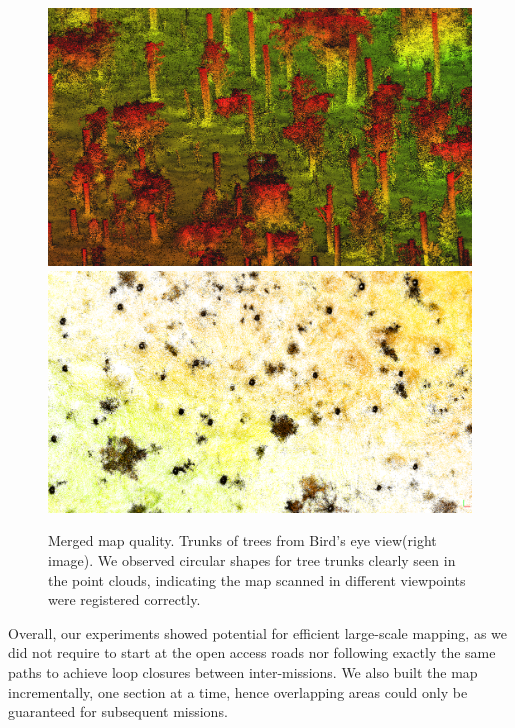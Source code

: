\begin{figure}[htbp]
  \centering
  \includegraphics[width=0.49\columnwidth]{pics/exp_3_offline_pointclouds_trunk.png}
  \includegraphics[width=0.49\columnwidth]{pics/exp_3_offline_pointclouds_trunk_BV3.png}
  \caption{Merged map quality. Trunks of trees from Bird's eye view(right image). We observed circular shapes for tree trunks clearly seen in the point clouds, indicating the map scanned in different viewpoints were registered correctly.}
  \label{fig:truk_of_trees}
\end{figure}

Overall, our experiments showed potential for efficient large-scale mapping, as we did not require to start at the open access roads nor following exactly the same paths to achieve loop closures between inter-missions. We also built the map incrementally, one section at a time, hence overlapping areas could only be guaranteed for subsequent missions.





